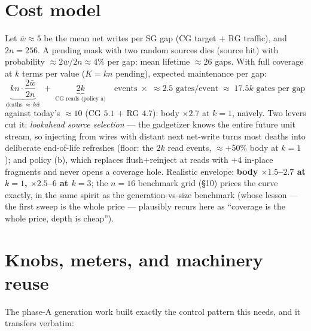 \documentclass[11pt]{article}
\begin{document}
\section{Cost model}

Let $\bar w \approx 5$ be the mean net writes per SG gap (CG target $+$ RG
traffic), and $2n = 256$. A pending mask with two random sources dies
(source hit) with probability $\approx 2\bar w / 2n \approx 4\%$ per gap:
mean lifetime $\approx 26$ gaps. With full coverage at $k$ terms per value
($K = kn$ pending), expected maintenance per gap:
\[
\underbrace{k n \cdot \frac{2 \bar w}{2n}}_{\text{deaths}\; \approx\, k
\bar w}
\;+\;
\underbrace{2k}_{\text{CG reads (policy a)}}
\quad \text{events} \;\times\; \approx 2.5 \text{ gates/event}
\;\approx\; 17.5k \text{ gates per gap}
\]
against today's $\approx 10$ (CG $5.1$ $+$ RG $4.7$): body $\times 2.7$
at $k{=}1$, na\"ively. Two levers cut it: \emph{lookahead source
selection} --- the gadgetizer knows the entire future unit stream, so
injecting from wires with distant next net-write turns most deaths into
deliberate end-of-life refreshes (floor: the $2k$ read events, $\approx
{+}50\%$ body at $k{=}1$); and policy (b), which replaces
flush$+$reinject at reads with $+4$ in-place fragments and never opens a
coverage hole. Realistic envelope: \textbf{body $\times 1.5$--$2.7$ at
$k{=}1$, $\times 2.5$--$6$ at $k{=}3$}; the $n{=}16$ benchmark grid
(\S10) prices the curve exactly, in the same spirit as the
generation-vs-size benchmark (whose lesson --- the first sweep is the
whole price --- plausibly recurs here as ``coverage is the whole price,
depth is cheap'').

\section{Knobs, meters, and machinery reuse}

The phase-A generation work built exactly the control pattern this needs,
and it transfers verbatim:
\end{document}
